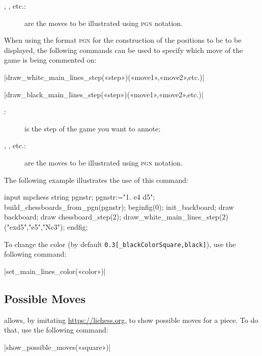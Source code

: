 \documentclass[english]{ltxdoc}
\begin{document}
\begin{description}
  \item[, , etc.:] are the moves to be illustrated using
\textsc{pgn} notation.
\end{description}
  
When using the format \textsc{pgn} for the construction of the positions to be  
to be displayed, the following commands can be used  
to specify which move of the game is being commented on:

\commande|draw_white_main_lines_step(«step»)(«move1»,«move2»,etc.)|\smallskip

\commande|draw_black_main_lines_step(«step»)(«move1»,«move2»,etc.)|\smallskip

\begin{description}
\item[:] is the step of the game you want to annote; 
\item[, , etc.:] are the moves to be illustrated using
\textsc{pgn} notation.
\end{description}

The following example illustrates the use of this command:
\begin{ExempleMP}
input mpchess
string pgnstr;
pgnstr:="1. e4 d5";
build_chessboards_from_pgn(pgnstr);
beginfig(0);
init_backboard;
draw backboard;
draw chessboard_step(2);
draw_white_main_lines_step(2)("exd5","e5","Nc3");
endfig;
\end{ExempleMP}

To change the color (by default \lstinline+0.3[_blackColorSquare,black]+),
 use the following command:

\commande|set_main_lines_color(«color»)|\smallskip


\subsection{Possible Moves}\label{sec:possiblemoves}

\mpchess allows, by imitating \href{Lichess.org}{https://lichess.org},
to show possible moves for a piece. To do that, use the following command:

\commande|show_possible_moves(«square»)|\smallskip
\end{document}
